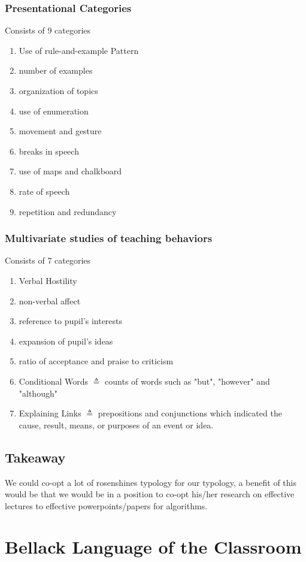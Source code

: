 \documentclass[10pt, letterpaper]{article}
\begin{document}
\subsubsection*{Presentational Categories}
\label{sec:orga5ddad9}
Consists of 9 categories
\begin{enumerate}
\item Use of rule-and-example Pattern
\item number of examples
\item organization of topics
\item use of enumeration
\item movement and gesture
\item breaks in speech
\item use of maps and chalkboard
\item rate of speech
\item repetition and redundancy
\end{enumerate}
\subsubsection*{Multivariate studies of teaching behaviors}
\label{sec:orgd94ad60}
Consists of 7 categories
\begin{enumerate}
\item Verbal Hostility
\item non-verbal affect
\item reference to pupil's interests
\item expansion of pupil's ideas
\item ratio of acceptance and praise to criticism
\item Conditional Words \(\triangleq\) counts of words such as "but", "however" and "although"
\item Explaining Links \(\triangleq\) prepositions and conjunctions which indicated the cause, result, means, or purposes of an event or idea.
\end{enumerate}

\subsection*{Takeaway}
\label{sec:org12e7c9b}
We could co-opt a lot of rosenshines typology for our typology, a benefit of this would be that we would be in a position to co-opt his/her research on effective lectures to effective powerpoints/papers for algorithms.

\section*{Bellack Language of the Classroom}
\label{sec:orga429eee}
\end{document}
